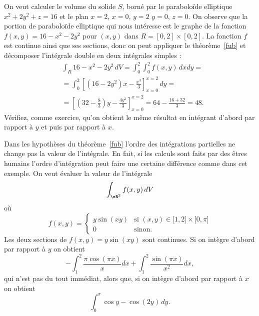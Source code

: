 \begin{example}
	On veut calculer le volume du solide \( S\), borné par le paraboloïde elliptique \( x^2+2y^2+z=16\) et le plan \( x=2\), \( x=0\), \( y=2\) \( y=0\), \( z=0\). On observe que la portion de  paraboloïde elliptique qui nous intéresse est le graphe de la fonction \( f(x,y)=16-x^2-2y^2\) pour \( (x,y)\) dans \( R=[0,2]\times[0,2]\). La fonction \( f\) est continue ainsi que ses sections, donc on peut appliquer le théorème~\ref{fub} et décomposer l'intégrale double en deux intégrales simples :
	\begin{equation}
		\begin{aligned}
			 & \int_R 16-x^2-2y^2 \,dV= \int_{0}^2\int_{0}^2f(x,y)\,dx dy=                                        \\
			 & =\int_0^2 \left[(16-2y^2)x-\frac{x^3}{3}\right]_{x=0}^{x=2}\, dy =                                 \\
			 & = \left[ \left(32-\frac{8}{3}\right) y -\frac{4y^3}{3}\right]_{x=0}^{x=2}= 64- \frac{16+32}{3}=48.
		\end{aligned}
	\end{equation}
	Vérifiez, comme exercice, qu'on obtient le même résultat en intégrant d'abord par rapport à \( y\) et puis par rapport à \( x\).
\end{example}

\begin{example}
	Dans les hypothèses du théorème~\ref{fub}  l'ordre des intégrations partielles ne change pas la valeur de l'intégrale. En fait, si les calculs sont faits par des êtres humains l'ordre d'intégration peut faire une certaine différence comme dans cet exemple. On veut évaluer la valeur de l'intégrale
	\[
		\int_{\eR^2}f(x,y)\, dV
	\]
	où
	\begin{equation}
		f(x,y)=\begin{cases}
			y\sin(xy) & \text{si }(x,y)\in\mathopen[ 1,2  \mathclose]\times\mathopen[ 0 , \pi \mathclose] \\
			0         & \text{sinon.}
		\end{cases}
	\end{equation}
	Les deux sections de \( f(x,y)=y\sin(xy)\) sont continues. Si on intègre d'abord par rapport à \( y\) on obtient
	\[
		-\int_1^2\frac{ \pi\cos(\pi x) }{ x }dx+\int_1^2\frac{ \sin(\pi x) }{ x^2 }dx,
	\]
	qui n'est pas du tout immédiat, alors que, si on intègre d'abord par rapport à \( x\) on obtient
	\[
		\int_0^\pi \cos y - \cos(2y)\,dy.
	\]
\end{example}

